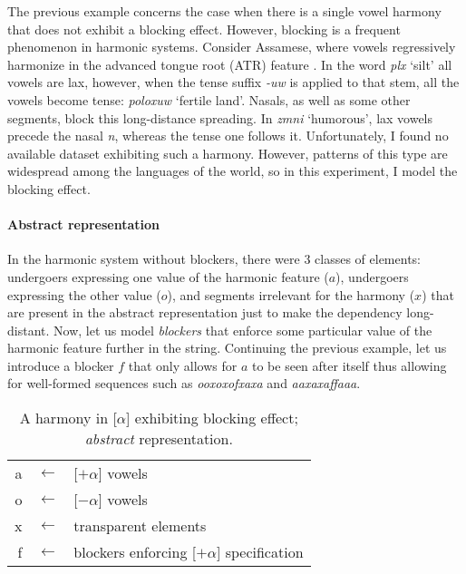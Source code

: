 The previous example concerns the case when there is a single vowel harmony that does not exhibit a blocking effect.
However, blocking is a frequent phenomenon in harmonic systems.
Consider Assamese, where vowels regressively harmonize in the advanced tongue root (ATR) feature \citep{Mahanta07}.
In the word \emph{p\textopeno l\textopeno x} `silt' all vowels are lax, however, when the tense suffix \emph{-uw\textturna} is applied to that stem, all the vowels become tense: \emph{poloxuw\textturna} `fertile land'.
Nasals, as well as some other segments, block this long-distance spreading.
In \emph{z\textopeno m\textopeno ni} `humorous', lax vowels precede the nasal \emph{n}, whereas the tense one follows it.
Unfortunately, I found no available dataset exhibiting such a harmony.
However, patterns of this type are widespread among the languages of the world, so in this experiment, I model the blocking effect.

\paragraph{Abstract representation}

In the harmonic system without blockers, there were $3$ classes of elements: undergoers expressing one value of the harmonic feature ($a$), undergoers expressing the other value ($o$), and segments irrelevant for the harmony ($x$) that are present in the abstract representation just to make the dependency long-distant.
Now, let us model \emph{blockers} that enforce some particular value of the harmonic feature further in the string.
Continuing the previous example, let us introduce a blocker $f$ that only allows for $a$ to be seen after itself thus allowing for well-formed sequences such as \emph{ooxoxofxaxa} and \emph{aaxaxaffaaa}.

\begin{table}[h!]
\begin{center}
\begin{tabular}{rcl}
a & $\leftarrow$ & {[}$+\alpha${]} vowels \\
o & $\leftarrow$ & {[}$-\alpha${]} vowels \\
x & $\leftarrow$ & transparent elements \\
f & $\leftarrow$ & blockers enforcing {[}$+\alpha${]} specification
\end{tabular}
\end{center}
\caption{A harmony in {[}$\alpha${]} exhibiting blocking effect; \emph{abstract} representation.}
\label{vhwbmap}
\end{table}

